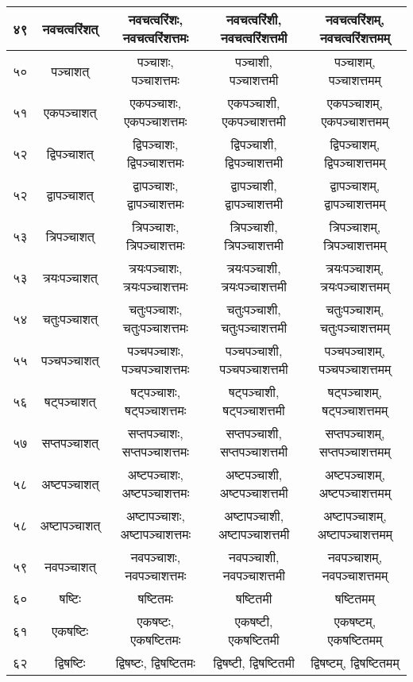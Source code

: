 \documentclass[leqno,fleqn,12pt]{article}%
\begin{document}
\begin{center}
\begin{supertabular}{|lc|c|c|c|}
४९ & नवचत्वरिंशत् & नवचत्वरिंशः, नवचत्वरिंशत्तमः & नवचत्वरिंशी, नवचत्वरिंशत्तमी & नवचत्वरिंशम्, नवचत्वरिंशत्तमम् \\ \hline 
५० & पञ्चाशत् & पञ्चाशः, पञ्चाशत्तमः & पञ्चाशी, पञ्चाशत्तमी & पञ्चाशम्, पञ्चाशत्तमम् \\ \hline 
५१ & एकपञ्चाशत् & एकपञ्चाशः, एकपञ्चाशत्तमः & एकपञ्चाशी, एकपञ्चाशत्तमी & एकपञ्चाशम्, एकपञ्चाशत्तमम् \\ \hline 
५२ & द्विपञ्चाशत् & द्विपञ्चाशः, द्विपञ्चाशत्तमः & द्विपञ्चाशी, द्विपञ्चाशत्तमी & द्विपञ्चाशम्, द्विपञ्चाशत्तमम् \\ \hline 
५२ & द्वापञ्चाशत् & द्वापञ्चाशः, द्वापञ्चाशत्तमः & द्वापञ्चाशी, द्वापञ्चाशत्तमी & द्वापञ्चाशम्, द्वापञ्चाशत्तमम् \\ \hline 
५३ & त्रिपञ्चाशत् & त्रिपञ्चाशः, त्रिपञ्चाशत्तमः & त्रिपञ्चाशी, त्रिपञ्चाशत्तमी & त्रिपञ्चाशम्, त्रिपञ्चाशत्तमम् \\ \hline 
५३ & त्रयःपञ्चाशत् & त्रयःपञ्चाशः, त्रयःपञ्चाशत्तमः & त्रयःपञ्चाशी, त्रयःपञ्चाशत्तमी & त्रयःपञ्चाशम्, त्रयःपञ्चाशत्तमम् \\ \hline 
५४ & चतुःपञ्चाशत् & चतुःपञ्चाशः, चतुःपञ्चाशत्तमः & चतुःपञ्चाशी, चतुःपञ्चाशत्तमी & चतुःपञ्चाशम्, चतुःपञ्चाशत्तमम् \\ \hline 
५५ & पञ्चपञ्चाशत् & पञ्चपञ्चाशः, पञ्चपञ्चाशत्तमः & पञ्चपञ्चाशी, पञ्चपञ्चाशत्तमी & पञ्चपञ्चाशम्, पञ्चपञ्चाशत्तमम् \\ \hline 
५६ & षट्पञ्चाशत् & षट्पञ्चाशः, षट्पञ्चाशत्तमः & षट्पञ्चाशी, षट्पञ्चाशत्तमी & षट्पञ्चाशम्, षट्पञ्चाशत्तमम् \\ \hline 
५७ & सप्तपञ्चाशत् & सप्तपञ्चाशः, सप्तपञ्चाशत्तमः & सप्तपञ्चाशी, सप्तपञ्चाशत्तमी & सप्तपञ्चाशम्, सप्तपञ्चाशत्तमम् \\ \hline 
५८ & अष्टपञ्चाशत् & अष्टपञ्चाशः, अष्टपञ्चाशत्तमः & अष्टपञ्चाशी, अष्टपञ्चाशत्तमी & अष्टपञ्चाशम्, अष्टपञ्चाशत्तमम् \\ \hline 
५८ & अष्टापञ्चाशत् & अष्टापञ्चाशः, अष्टापञ्चाशत्तमः & अष्टापञ्चाशी, अष्टापञ्चाशत्तमी & अष्टापञ्चाशम्, अष्टापञ्चाशत्तमम् \\ \hline 
५९ & नवपञ्चाशत् & नवपञ्चाशः, नवपञ्चाशत्तमः & नवपञ्चाशी, नवपञ्चाशत्तमी & नवपञ्चाशम्, नवपञ्चाशत्तमम् \\ \hline 
६० & षष्टिः & षष्टितमः & षष्टितमी & षष्टितमम् \\ \hline 
६१ & एकषष्टिः & एकषष्टः, एकषष्टितमः & एकषष्टी, एकषष्टितमी & एकषष्टम्, एकषष्टितमम् \\ \hline 
६२ & द्विषष्टिः & द्विषष्टः, द्विषष्टितमः & द्विषष्टी, द्विषष्टितमी & द्विषष्टम्, द्विषष्टितमम् \\ \hline 

\end{supertabular}
\end{center}
\end{document}
